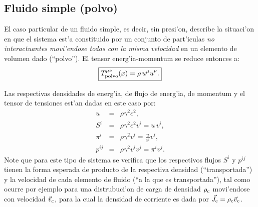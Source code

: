 \subsection{Fluido simple (polvo)}

El caso particular de un fluido simple, es decir, sin presi'on, describe la situaci'on en que el sistema est'a constituido por  un conjunto de part'iculas \textit{no interactuantes movi'endose todas con la misma velocidad} en un elemento de volumen dado (``polvo''). El tensor energ'ia-momentum se reduce entonces a:
\begin{equation}
\boxed{T_{\rm polvo}^{\mu\nu}(x)=\rho\, u^\mu u^\nu.}
\end{equation}

Las respectivas densidades de energ'ia, de flujo de energ'ia, de momentum y el
tensor de tensiones est'an dadas en este caso por:
\begin{eqnarray}
u&=&\rho \gamma^2 c^2, \\ 
S^i&=&\rho \gamma^2c^2v^i=u\,v^i, \\ 
{\pi}^i&=&\rho \gamma^2v^i =\frac{u}{c^2}v^i, \\ 
p^{ij} &=&\rho \gamma^2 v^i v^j=\pi^iv^j.
\end{eqnarray}
Note que para este tipo de sistema se verifica que los respectivos flujos $S^i$ y $p^{ij}$ tienen la forma esperada de producto de la respectiva densidad (``transportada'') y la velocidad de cada elemento de fluido (``a la que es transportada''), tal como ocurre por ejemplo para una distrubuci'on de carga de densidad $\rho_{\rm c}$ movi'endose con velocidad $\vec{v}_{\rm c}$, para la cual la densidad de corriente es dada por $\vec{J}_{\rm c}=\rho_{\rm c}\vec{v}_{\rm c}$.

